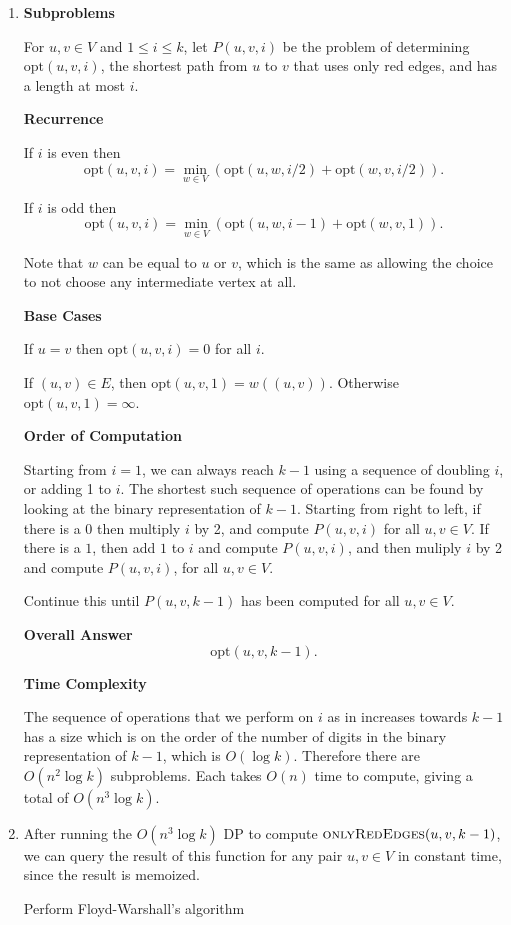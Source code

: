 \documentclass{article}
\begin{document}
\begin{solution}
\begin{enumerate}[label = (\alph*)]
    \item 

    \textbf{Subproblems}

    For $u, v\in V$ and $1\leq i \leq k$, let $P(u, v, i)$ be the problem of determining $\mathrm{opt}(u, v, i)$, the shortest 
    path from $u$ to $v$ that uses only red edges, and has a length at most $i$.

    \textbf{Recurrence}

    If $i$ is even then
    $$
    \mathrm{opt}(u, v, i) = \min_{w \in V}(\mathrm{opt}(u, w, i/2) + \mathrm{opt}(w, v, i/2)).
    $$

    If $i$ is odd then
    $$
    \mathrm{opt}(u, v, i) = \min_{w \in V}(\mathrm{opt}(u, w, i - 1) + \mathrm{opt}(w, v, 1)).
    $$

    Note that $w$ can be equal to $u$ or $v$, which is the same as allowing the choice to not 
    choose any intermediate vertex at all.

    \textbf{Base Cases}

    If $u = v$ then $\mathrm{opt}(u, v, i)=0$ for all $i$. 
    
    If $(u,v)\in E$, then $\mathrm{opt}(u, v, 1)=w((u, v))$. Otherwise $\mathrm{opt}(u, v, 1) = \infty$.

    \textbf{Order of Computation}

    Starting from $i = 1$, we can always reach $k-1$ using a sequence of doubling $i$, or adding 1 to $i$. 
    The shortest such sequence of operations can be found by looking at the binary representation of $k-1$. 
    Starting from right to left, if there is a $0$ then multiply $i$ by 2, and compute $P(u,v,i)$ for all $u,v\in V$.
    If there is a $1$, then add $1$ to $i$ and compute $P(u,v,i)$, and then muliply $i$ by 2 and compute $P(u,v,i)$, for all $u,v\in V$.

    Continue this until $P(u, v, k-1)$ has been computed for all $u,v\in V$.


    \textbf{Overall Answer}
    $$\mathrm{opt}(u, v, k-1).$$

    \textbf{Time Complexity}

    The sequence of operations that we perform on $i$ as in increases towards $k-1$
    has a size which is on the order of the number of digits in the binary representation 
    of $k-1$, which is $O(\log k)$. Therefore there are $O(n^2 \log k)$ subproblems.
    Each takes $O(n)$ time to compute, giving a total of $O(n^3 \log k)$.

    \pagebreak
    \item 
    After running the $O(n^3 \log k)$ DP to compute $\textsc{onlyRedEdges}(u, v, k-1)$, we can query the result of this function for any pair $u,v\in V$ in constant time, since the result is memoized.

    Perform Floyd-Warshall's algorithm 


\end{enumerate}
\end{solution}
\end{document}
